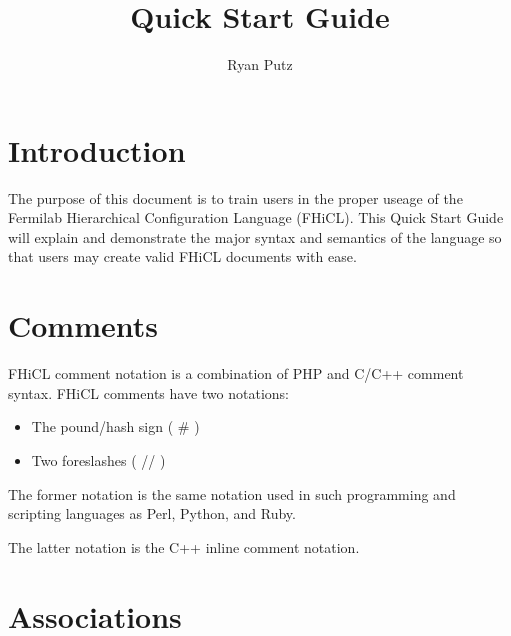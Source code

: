 \documentclass{article}
\begin{document}
\setlength{\parindent}{0in}
\title{Quick Start Guide}
\author{Ryan Putz}
\maketitle
\newpage

\tableofcontents
\newpage

\section{Introduction}
	The purpose of this document is to train users in the proper useage
	of the Fermilab Hierarchical Configuration Language (FHiCL).
	This Quick Start Guide will explain and demonstrate the major syntax and semantics
	of the language so that users may create valid FHiCL documents with ease.
\section{Comments}
	FHiCL comment notation is a combination of PHP and C/C++ comment syntax.
	FHiCL comments have two notations:
	\begin{itemize}
		\item The pound/hash sign ( \# )
		\item Two foreslashes ( // )
	\end{itemize}
	\par
	The former notation is the same notation used in such programming and scripting languages as
	Perl, Python, and Ruby.
	\par
	The latter notation is the C++ inline comment notation.
	\par
\section{Associations}
\end{document}
